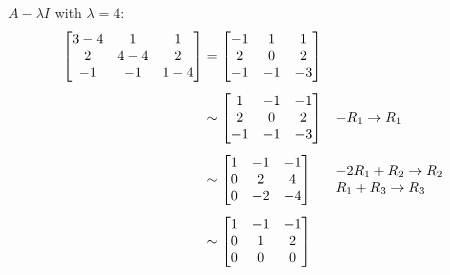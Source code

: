 \documentclass[10pt,letterpaper,final]{report}
\newcommand{\reason}[1]{&& \text{#1}}
\begin{document}
\begin{enumerate}[label=(\alph*)]
        $A - \lambda I$ with $\lambda = 4$:
        \begin{align*}
          \begin{bmatrix}
            3 - 4 & 1     & 1     \\
            2     & 4 - 4 & 2     \\
            -1    & -1    & 1 - 4
          \end{bmatrix} & = \begin{bmatrix}
                              -1 & 1  & 1  \\
                              2  & 0  & 2  \\
                              -1 & -1 & -3
                            \end{bmatrix}                                                                                                            \\[1ex]
                                     & \sim \begin{bmatrix}
                                              1  & -1 & -1 \\
                                              2  & 0  & 2  \\
                                              -1 & -1 & -3
                                            \end{bmatrix} \reason{$-R_1 \to R_1$}                                                                       \\[1ex]
                                     & \sim \begin{bmatrix}
                                              1 & -1 & -1 \\
                                              0 & 2  & 4  \\
                                              0 & -2 & -4
                                            \end{bmatrix} \reason{\begin{tabular}[c]{@{}l@{}}$-2R_1 + R_2 \to R_2$ \\ $R_1 + R_3 \to R_3$\end{tabular}} \\[1ex]
                                     & \sim \begin{bmatrix}
                                              1 & -1 & -1 \\
                                              0 & 1  & 2  \\
                                              0 & 0  & 0

\end{bmatrix}
\end{align*}
\end{enumerate}
\end{document}
